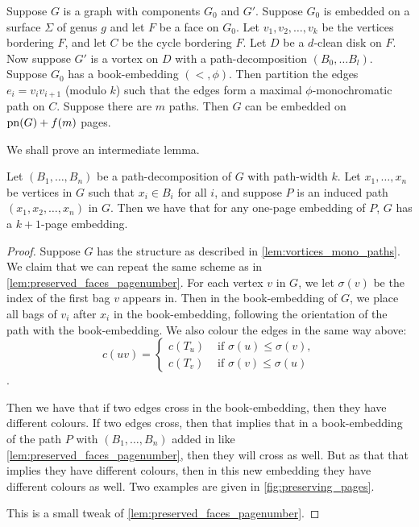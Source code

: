 \begin{lemma}\label{lem:vortices_mono_paths}
	Suppose \(G\) is a graph with components \(G_0\) and \(G'\). Suppose \(G_0\) is embedded on a surface \(\Sigma \) of genus \(g\) and let \(F\) be a face on \(G_0\). Let \(v_1, v_2, \ldots, v_k\) be the vertices bordering \(F\), and let \(C\) be the cycle bordering \(F\). Let \(D\) be a \(d\)-clean disk on \(F\). Now suppose \(G'\) is a vortex on \(D\) with a path-decomposition \((B_0, \ldots B_l)\). Suppose \(G_0\) has a book-embedding \((<, \phi)\). Then partition the edges \(e_i = v_i v_{i + 1}\) (modulo \(k\)) such that the edges form a maximal \(\phi \)-monochromatic path on \(C\). Suppose there are \(m\) paths. Then \(G\) can be embedded on \(\operatorname{pn}(G) + f(m)\) pages.
\end{lemma}
We shall prove an intermediate lemma.
\begin{lemma}\label{lem:one_page_decomposition}
	Let \((B_1, \ldots, B_n)\) be a path-decomposition of \(G\) with path-width \(k\). Let \(x_1, \ldots, x_n\) be vertices in \(G\) such that \(x_i \in B_i\) for all \(i\), and suppose \(P\) is an induced path \((x_1, x_2, \ldots, x_n)\) in \(G\). Then we have that for any one-page embedding of \(P\), \(G\) has a \(k + 1\)-page embedding.
\end{lemma}
\begin{proof}
	Suppose \(G\) has the structure as described in \cref{lem:vortices_mono_paths}. 
	We claim that we can repeat the same scheme as in \cref{lem:preserved_faces_pagenumber}. For each vertex \(v\) in \(G\), we let \(\sigma(v)\) be the index of the first bag \(v\) appears in. Then in the book-embedding of \(G\), we place all bags of \(v_i\) after \(x_i\) in the book-embedding, following the orientation of the path with the book-embedding. We also colour the edges in the same way above: 
	\begin{equation}
		c(uv) =
		\begin{cases}
			c(T_u) & \text{ if } \sigma(u) \leq \sigma(v), \\
			c(T_v) & \text{ if } \sigma(v) \leq \sigma(u)
		\end{cases}
	\end{equation}.

	Then we have that if two edges cross in the book-embedding, then they have different colours. If two edges cross, then that implies that in a book-embedding of the path \(P\) with \((B_1, \ldots, B_n)\) added in like \cref{lem:preserved_faces_pagenumber}, then they will cross as well. But as that that implies they have different colours, then in this new embedding they have different colours as well. Two examples are given in \cref{fig:preserving_pages}.

	This is a small tweak of \cref{lem:preserved_faces_pagenumber}. 
\end{proof}


